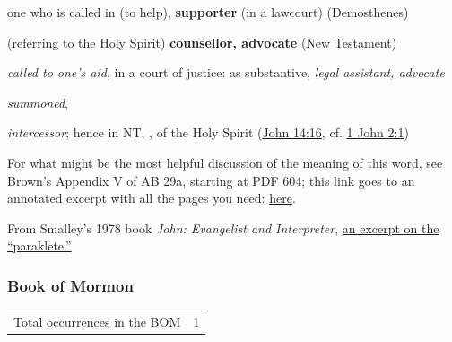 \begin{compactdesc}
					\item[CGL 1069b, PDF 1109] \textbf{}
						\begin{compactitem}
							\item[1] one who is called in (to help), \textbf{supporter} (in a lawcourt) (Demosthenes)
							\item[2] (referring to the Holy Spirit) \textbf{counsellor, advocate} (New Testament)
						\end{compactitem}
					\item[LSJ 1313a, PDF 1384] \textbf{}
						\begin{compactitem}
							\item[I.1] \textit{called to one's aid}, in a court of justice: as substantive, \textit{legal assistant, advocate}
							\item[I.2] \textit{summoned}, 
							\item[II] \textit{intercessor}; hence in NT, , of the Holy Spirit (\hyperref[JOHN-14-16]{John 14:16}, cf. \hyperref[1JOHN-2-1]{1 John 2:1})
						\end{compactitem}
					\item[Other sources] \phantom{.}
						\begin{compactitem}
							\item For what might be the most helpful discussion of the meaning of this word, see Brown's Appendix V of AB 29a, starting at PDF 604; this link goes to an annotated excerpt with all the pages you need: \href{https://drive.google.com/file/d/10zIKL33glyccw-vZwPUUZJatlqmsOOdh/view?usp=sharing}{here}.
							\item From Smalley's 1978 book \textit{John: Evangelist and Interpreter}, \href{https://drive.google.com/file/d/10_iMGwsHXcFinOCoO7j2GGI6oFtGnCa9/view?usp=sharing}{an excerpt on the ``paraklete.''}
						\end{compactitem}
				\end{compactdesc}
		
	\subsubsection{Book of Mormon} %
		\label{COMFORTER-BOM}
	
		\begin{tabular}{ll}
			Total occurrences in the BOM & 1
		\end{tabular}
		
		\begin{compactdesc}
			\item[{\hyperref[MORONI-8-26]{Moroni 8:26}}]
		\end{compactdesc}
		
